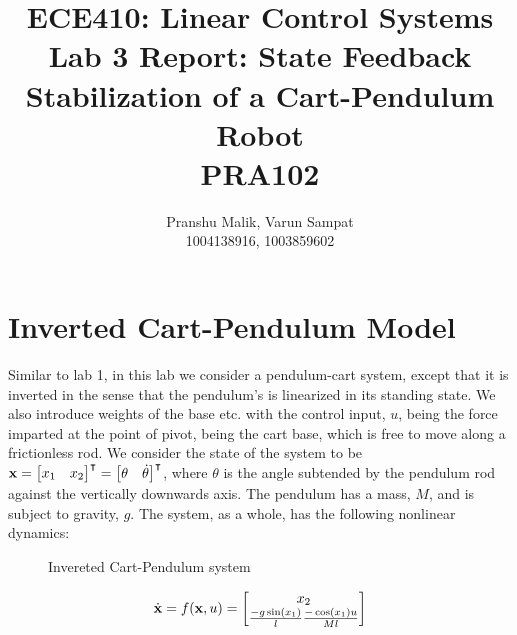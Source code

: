 \documentclass[10pt]{article}
\date{}
\begin{document}
\title{\textbf{\Large{\textsc{ECE410:} Linear Control Systems}} \\ \Large{Lab 3 Report: State Feedback Stabilization of a Cart-Pendulum Robot} \\ \textbf{\small{PRA102}}\vspace{-0.3cm}}
\author{Pranshu Malik, Varun Sampat \\ \footnotesize{1004138916}, \footnotesize{1003859602}\vspace{-3cm}}

\maketitle

\section{Inverted Cart-Pendulum Model}
Similar to lab 1, in this lab we consider a pendulum-cart system, except that it is inverted in the sense that the pendulum's is linearized in its standing state. We also introduce weights of the base etc. with the control input, $u$, being the force imparted at the point of pivot, being the cart base, which is free to move along a frictionless rod. We consider the state of the system to be $\mathbf{x} = \begin{bmatrix} x_1 & x_2 \end{bmatrix}^\intercal = \begin{bmatrix} \theta & \dot{\theta} \end{bmatrix}^\intercal$, where $\theta$ is the angle subtended by the pendulum rod against the vertically downwards axis. The pendulum has a mass, $M$, and is subject to gravity, $g$. The system, as a whole, has the following nonlinear dynamics:

\begin{figure}[!h]
\centering
\invertedpendcart
\caption{Invereted Cart-Pendulum system}
\end{figure}

\begin{equation*}
    \dot{\mathbf{x}} = f(\mathbf{x}, u) = \begin{bmatrix}  x_2 \\ \frac{-g \sin(x_1)}{l} \frac{-\cos(x_1)u}{Ml} \end{bmatrix}
\end{equation*}
\end{document}
